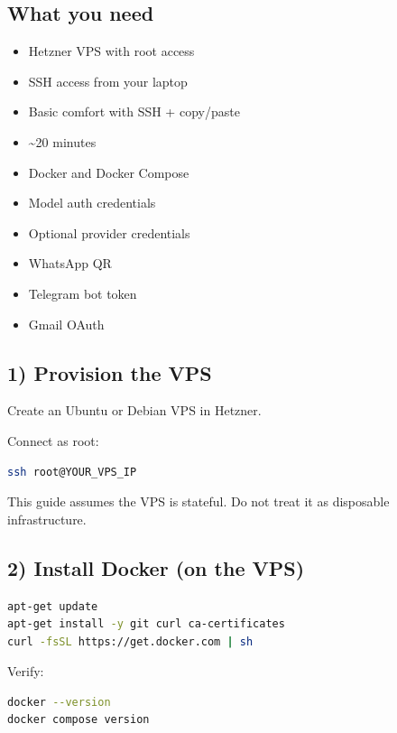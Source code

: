 \hrulefill


\subsection{What you need}


\begin{itemize}
  \item Hetzner VPS with root access
  \item SSH access from your laptop
  \item Basic comfort with SSH + copy/paste
  \item \textasciitilde{}20 minutes
  \item Docker and Docker Compose
  \item Model auth credentials
  \item Optional provider credentials
  \item WhatsApp QR
  \item Telegram bot token
  \item Gmail OAuth
\end{itemize}


\hrulefill


\subsection{1) Provision the VPS}


Create an Ubuntu or Debian VPS in Hetzner.

Connect as root:

\begin{lstlisting}[language=bash]
ssh root@YOUR_VPS_IP
\end{lstlisting}


This guide assumes the VPS is stateful.
Do not treat it as disposable infrastructure.

\hrulefill


\subsection{2) Install Docker (on the VPS)}


\begin{lstlisting}[language=bash]
apt-get update
apt-get install -y git curl ca-certificates
curl -fsSL https://get.docker.com | sh
\end{lstlisting}


Verify:

\begin{lstlisting}[language=bash]
docker --version
docker compose version
\end{lstlisting}


